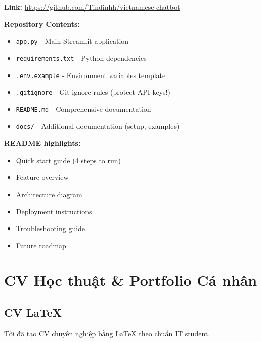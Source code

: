 \documentclass[12pt,a4paper]{article}
\begin{document}
\textbf{Link:} \url{https://github.com/Tindinhh/vietnamese-chatbot}

\textbf{Repository Contents:}
\begin{itemize}
    \item \texttt{app.py} - Main Streamlit application
    \item \texttt{requirements.txt} - Python dependencies
    \item \texttt{.env.example} - Environment variables template
    \item \texttt{.gitignore} - Git ignore rules (protect API keys!)
    \item \texttt{README.md} - Comprehensive documentation
    \item \texttt{docs/} - Additional documentation (setup, examples)
\end{itemize}

\textbf{README highlights:}
\begin{itemize}
    \item Quick start guide (4 steps to run)
    \item Feature overview
    \item Architecture diagram
    \item Deployment instructions
    \item Troubleshooting guide
    \item Future roadmap
\end{itemize}

\newpage


\section{CV Học thuật \& Portfolio Cá nhân}

\subsection{CV LaTeX}

Tôi đã tạo CV chuyên nghiệp bằng LaTeX theo chuẩn IT student.
\end{document}
